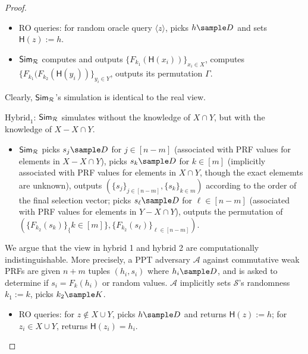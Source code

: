 \begin{proof}
\begin{trivlist}
\begin{itemize}
    \item RO queries: for random oracle query $\langle z \rangle$, picks $h \sample D$ and sets $\mathsf{H}(z):=h$. 

    \item $\mathsf{Sim}_\mathcal{R}$ computes and outputs 
        $\{F_{k_1}(\mathsf{H}(x_i))\}_{x_i \in X}$, 
        computes $\{F_{k_1}(F_{k_2}(\mathsf{H}(y_i))\}_{y_i \in Y}$, outputs its permutation $\Gamma$.      
\end{itemize}
Clearly, $\mathsf{Sim}_\mathcal{R}$'s simulation is identical to the real view. 

\begin{center}
\end{center}

\item $\text{Hybrid}_1$: $\mathsf{Sim}_\mathcal{R}$ simulates without the knowledge of $X \cap Y$, 
    but with the knowledge of $X - X \cap Y$.   
\begin{itemize}
    \item $\mathsf{Sim}_\mathcal{R}$ picks $s_j \sample D$ for $j \in [n-m]$ (associated with PRF values for elements in $X - X \cap Y$), 
        picks $s_k \sample D$ for $k \in [m]$ (implicitly associated with PRF values for elements in $X \cap Y$, 
        though the exact elememts are unknown), 
        outputs $(\{s_j\}_{j \in [n-m]}, \{s_k\}_{k \in m})$ according to the order of the final selection vector; 
        picks $s_\ell \sample D$ for $\ell \in [n-m]$ (associated with PRF values for elements in  $Y - X \cap Y$),  
        outputs the permutation of $(\{F_{k_2}(s_k)\}_\{k \in [m]\}, \{F_{k_2}(s_\ell)\}_{\ell \in [n-m]})$.                
\end{itemize}

We argue that the view in hybrid 1 and hybrid 2 are computationally indistinguishable. 
More precisely, a PPT adversary $\mathcal{A}$  against commutative weak PRFs 
are given $n+m$ tuples $(h_i, s_i)$ where $h_i \sample D$, and is asked to determine if $s_i = F_{k}(h_i)$ or random values. 
$\mathcal{A}$ implicitly sets $\mathcal{S}$'s randomness $k_1:=k$, picks $k_2 \sample K$. 
\begin{itemize}
    \item RO queries: for $z \notin X \cup Y$, picks $h \sample D$ and returns $\mathsf{H}(z):=h$; 
        for $z_i \in X \cup Y$, returns $\mathsf{H}(z_i) = h_i$. 


\end{itemize}
\end{trivlist}
\end{proof}
